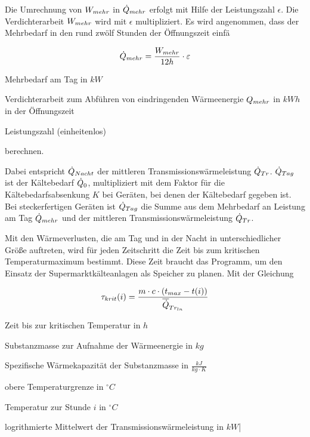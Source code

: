 Die Umrechnung von $\lmehr$ in $\pmehr$ erfolgt mit Hilfe der Leistungszahl
$\epsilon$. Die Verdichterarbeit $\lmehr$ wird mit $\epsilon$ multipliziert.
Es wird angenommen, dass der Mehrbedarf in den rund zw\"olf Stunden der
\"Offnungszeit einf\"a

\begin{equation}
	\pmehr = \frac{\lmehr}{12h} \cdot \epsilon
\label{<++>}
\end{equation}

\begin{description}[\dth]

	\item[$\pmehr$] Mehrbedarf am Tag in $kW$
	\item[$\lmehr$] Verdichterarbeit zum Abführen von eindringenden
		Wärmeenergie $Q_{mehr}$ in $kWh$ in der \"Offnungszeit
	\item[$\epsilon$] Leistungszahl (einheitenlos)

\end{description}
\vspace{0.5cm}
berechnen.

Dabei entspricht $\dot{Q}_{Nacht}$ der mittleren Transmissionswärmeleistung
$\dot{Q}_{Tr}$.
$\dot{Q}_{Tag}$ ist der Kältebedarf $\dot{Q}_{0}$, multipliziert mit dem Faktor für die
Kältebedarfsabsenkung $K$ bei Geräten, bei denen der Kältebedarf gegeben ist.
Bei steckerfertigen Geräten ist $\dot{Q}_{Tag}$ die Summe aus dem Mehrbedarf an Leistung
am Tag $\pmehr$ und der mittleren Transmissionswärmeleistung $\dot{Q}_{Tr}$.

Mit den Wärmeverlusten, die am Tag und in der Nacht in unterschiedlicher Größe
auftreten, wird für jeden Zeitschritt die Zeit bis zum kritischen
Temperaturmaximum bestimmt. Diese Zeit braucht das Programm, um den Einsatz der
Supermarktkälteanlagen als Speicher zu planen. Mit der Gleichung

\begin{equation}
	\tau_{krit}(i) = \frac{m \cdot c \cdot (t_{max} -
		t(i))}{\aptranslog}
\label{taukn}
\end{equation}

\begin{description}[\dth]

	\item[$\tau_{krit}$] Zeit bis zur kritischen Temperatur in $h$
	\item[$m$] Substanzmasse zur Aufnahme der Wärmeenergie in $kg$
	\item[$c$] Spezifische Wärmekapazität der Substanzmasse in $\frac{kJ}{kg
		\cdot K}$
	\item[$t_{max}$] obere Temperaturgrenze in $ ^{\circ} C $
	\item[$t(i)$] Temperatur zur Stunde $i$ in $ ^{\circ} C $
	\item[$\aptranslog$] logrithmierte Mittelwert der
		Transmissionswärmeleistung in $kW$|
\end{description}
\vspace{0.5cm}


